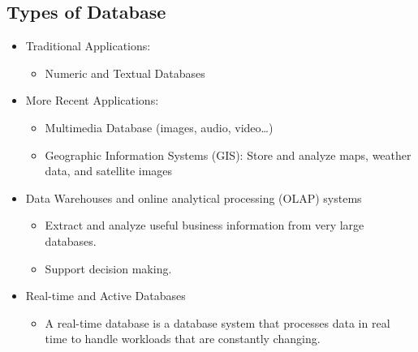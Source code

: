\documentclass[a4paper, 12pt]{article}
\begin{document}
    \subsection{Types of Database}
    \begin{itemize}
        \item Traditional Applications:
        \begin{itemize}
            \item Numeric and Textual Databases
        \end{itemize}
        \item More Recent Applications:
        \begin{itemize}
            \item Multimedia Database (images, audio, video…)
            \item Geographic Information Systems (GIS): Store and analyze maps, weather data, and satellite images
        \end{itemize}
        \item Data Warehouses and online analytical processing (OLAP) systems
        \begin{itemize}
            \item Extract and analyze useful business information from very
            large databases.
            \item Support decision making.
        \end{itemize}
        \item Real-time and Active Databases
        \begin{itemize}
            \item A real-time database is a database system that processes
            data in real time to handle workloads that are constantly
            changing.
        \end{itemize}
    \end{itemize}
\end{document}
